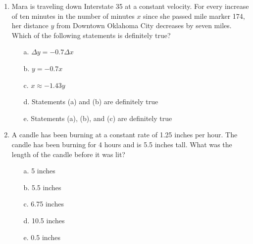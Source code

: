 \documentclass[12pt]{report}
\begin{document}
\begin{enumerate}
\item Mara is traveling down Interstate 35 at a constant velocity. For every increase of ten minutes in the number of minutes $x$ since she passed mile marker 174, her distance $y$ from Downtown Oklahoma City decreases by seven miles. Which of the following statements is definitely true?
\vspace{0.2cm}
\begin{enumerate}
\item [a.] $\Delta y = -0.7 \Delta x$
\item [b.] $y = -0.7x$
\item [c.] $x \approx -1.43y$
\item [d.] Statements (a) and (b) are definitely true
\item [e.] Statements (a), (b), and (c) are definitely true
\end{enumerate}

\item A candle has been burning at a constant rate of 1.25 inches per hour. The candle has been burning for 4 hours and is 5.5 inches tall. What was the length of the candle before it was lit?
\vspace{0.2cm}
\begin{enumerate}
\item [a.] 5 inches 
\item [b.] 5.5 inches
\item [c.] 6.75 inches
\item [d.] 10.5 inches
\item [e.] 0.5 inches
\end{enumerate}

\end{enumerate}
\end{document}
